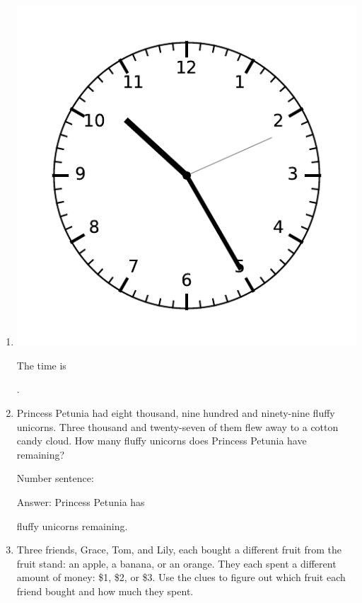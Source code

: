 \documentclass{tufte-book}
\begin{document}
\begin{enumerate}

\item \begin{marginfigure}\includegraphics[width=\textwidth]{fig/clock_1025.pdf}\end{marginfigure}
The time is \dotfill\bigskip\par\dotfill\bigskip.\par

\item Princess Petunia had eight thousand, nine hundred and ninety-nine fluffy unicorns.
Three thousand and twenty-seven of them flew away to a cotton candy cloud.
How many fluffy unicorns does Princess Petunia have remaining?\medskip\par
Number sentence: \dotfill\medskip\par
Answer: Princess Petunia has 
\dotfill\medskip\par\mbox{}\dotfill\medskip\par\mbox{}\dotfill\bigskip
 fluffy unicorns remaining.

\item %

Three friends, Grace, Tom, and Lily, each bought a different fruit
from the fruit stand: an apple, a banana, or an orange. They each
spent a different amount of money: \$1, \$2, or \$3. Use the clues
to figure out which fruit each friend bought and how much they spent.


\end{enumerate}
\end{document}
